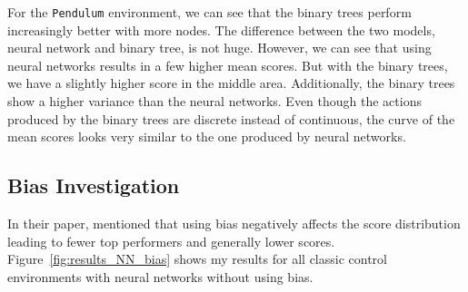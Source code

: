 For the \verb|Pendulum| environment, we can see that the binary trees perform increasingly better with more nodes. The difference between the two models, neural network and binary tree, is not huge. However, we can see that using neural networks results in a few higher mean scores. But with the binary trees, we have a slightly higher score in the middle area. Additionally, the binary trees show a higher variance than the neural networks. Even though the actions produced by the binary trees are discrete instead of continuous, the curve of the mean scores looks very similar to the one produced by neural networks.


\subsection{Bias Investigation}
In their paper, \citet{oller_analyzing_2020} mentioned that using bias negatively affects the score distribution leading to fewer top performers and generally lower scores. Figure~\ref{fig:results_NN_bias} shows my results for all classic control environments with neural networks without using bias.
